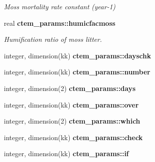 \begin{DoxyCompactItemize}
\begin{DoxyCompactList}\small\item\em Moss mortality rate constant (year-\/1) \end{DoxyCompactList}\item 
\hypertarget{namespacectem__params_aee7e81fdfd02f048571b235327549b35}{}real {\bfseries ctem\+\_\+params\+::humicfacmoss}\label{namespacectem__params_aee7e81fdfd02f048571b235327549b35}

\begin{DoxyCompactList}\small\item\em Humification ratio of moss litter. \end{DoxyCompactList}\item 
\hypertarget{namespacectem__params_abae86d324b328aaf473431198d8e3642}{}integer, dimension(kk) {\bfseries ctem\+\_\+params\+::dayschk}\label{namespacectem__params_abae86d324b328aaf473431198d8e3642}

\item 
\hypertarget{namespacectem__params_ad87cc3d3a1e10b060a586ee92a61bb7b}{}integer, dimension(kk) {\bfseries ctem\+\_\+params\+::number}\label{namespacectem__params_ad87cc3d3a1e10b060a586ee92a61bb7b}

\item 
\hypertarget{namespacectem__params_a299b91ac529cbabb523c4ac48fd36448}{}integer, dimension(2) {\bfseries ctem\+\_\+params\+::days}\label{namespacectem__params_a299b91ac529cbabb523c4ac48fd36448}

\item 
\hypertarget{namespacectem__params_a68011aefa2e96ca1949d0cf45eee4993}{}integer, dimension(kk) {\bfseries ctem\+\_\+params\+::over}\label{namespacectem__params_a68011aefa2e96ca1949d0cf45eee4993}

\item 
\hypertarget{namespacectem__params_a28e87bd094ce9a1d0e703d5dceb4b5c5}{}integer, dimension(2) {\bfseries ctem\+\_\+params\+::which}\label{namespacectem__params_a28e87bd094ce9a1d0e703d5dceb4b5c5}

\item 
\hypertarget{namespacectem__params_a7ca3f3e60f41c3814e333e0b69b7dc33}{}integer, dimension(kk) {\bfseries ctem\+\_\+params\+::check}\label{namespacectem__params_a7ca3f3e60f41c3814e333e0b69b7dc33}

\item 
\hypertarget{namespacectem__params_a301f46565b84b8d65a2e624388023431}{}integer, dimension(kk) {\bfseries ctem\+\_\+params\+::if}\label{namespacectem__params_a301f46565b84b8d65a2e624388023431}


\end{DoxyCompactItemize}
